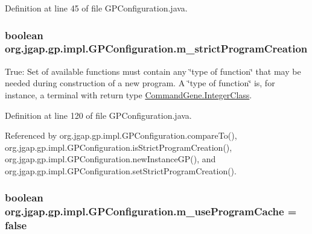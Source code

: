Definition at line 45 of file G\-P\-Configuration.\-java.

\hypertarget{classorg_1_1jgap_1_1gp_1_1impl_1_1_g_p_configuration_ac6b717451d188c9ee860e2bb3c811731}{
\subsubsection[{m\-\_\-strict\-Program\-Creation}]{\setlength{\rightskip}{0pt plus 5cm}boolean org.\-jgap.\-gp.\-impl.\-G\-P\-Configuration.\-m\-\_\-strict\-Program\-Creation\hspace{0.3cm}{\ttfamily [private]}}}\label{classorg_1_1jgap_1_1gp_1_1impl_1_1_g_p_configuration_ac6b717451d188c9ee860e2bb3c811731}
True\-: Set of available functions must contain any \char`\"{}type of function\char`\"{} that may be needed during construction of a new program. A \char`\"{}type of function\char`\"{} is, for instance, a terminal with return type \hyperlink{classorg_1_1jgap_1_1gp_1_1_command_gene_a8e354d57c541097dab355e145b048b22}{Command\-Gene.\-Integer\-Class}. 

Definition at line 120 of file G\-P\-Configuration.\-java.



Referenced by org.\-jgap.\-gp.\-impl.\-G\-P\-Configuration.\-compare\-To(), org.\-jgap.\-gp.\-impl.\-G\-P\-Configuration.\-is\-Strict\-Program\-Creation(), org.\-jgap.\-gp.\-impl.\-G\-P\-Configuration.\-new\-Instance\-G\-P(), and org.\-jgap.\-gp.\-impl.\-G\-P\-Configuration.\-set\-Strict\-Program\-Creation().

\hypertarget{classorg_1_1jgap_1_1gp_1_1impl_1_1_g_p_configuration_a8f9f463a64903084b9c05763d5349831}{
\subsubsection[{m\-\_\-use\-Program\-Cache}]{\setlength{\rightskip}{0pt plus 5cm}boolean org.\-jgap.\-gp.\-impl.\-G\-P\-Configuration.\-m\-\_\-use\-Program\-Cache = false\hspace{0.3cm}{\ttfamily [private]}}}\label{classorg_1_1jgap_1_1gp_1_1impl_1_1_g_p_configuration_a8f9f463a64903084b9c05763d5349831}



